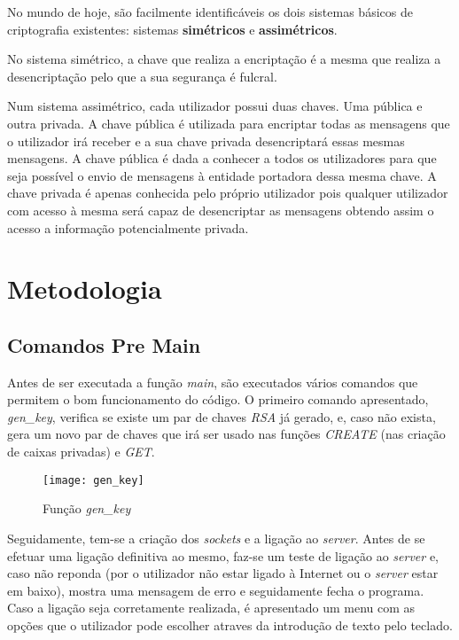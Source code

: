 \documentclass{report}
\begin{document}
No mundo de hoje, são facilmente identificáveis os dois sistemas básicos de criptografia existentes: sistemas \textbf{simétricos} e \textbf{assimétricos}.

No sistema simétrico, a chave que realiza a encriptação é a mesma que realiza a desencriptação pelo que a sua segurança é fulcral.

Num sistema assimétrico, cada utilizador possui duas chaves. Uma pública e outra privada.
A chave pública é utilizada para encriptar todas as mensagens que o utilizador irá receber e a sua chave privada desencriptará essas mesmas mensagens.
A chave pública é dada a conhecer a todos os utilizadores para que seja possível o envio de mensagens à entidade portadora dessa mesma chave.
A chave privada é apenas conhecida pelo próprio utilizador pois qualquer utilizador com acesso à mesma será capaz de desencriptar as mensagens obtendo assim o acesso a informação potencialmente privada.

\FloatBarrier
\chapter{Metodologia}
\label{chap.metodologia}
\section{Comandos Pre Main}

Antes de ser executada a função \textit{main}, são executados vários comandos que permitem o bom funcionamento do código.\br
O primeiro comando apresentado, \textit{gen\_key}, verifica se existe um par de chaves \textit{RSA} já gerado, e, caso não exista, gera um novo par de chaves que irá ser usado nas funções \textit{CREATE} (nas criação de caixas privadas) e \textit{GET}.


\begin{figure}[h]
\center
\texttt{[image: gen\_key]}
\caption{Função \textit{gen\_key}}
\label{fig:gen_key}
\end{figure}


Seguidamente, tem-se a criação dos \textit{sockets} e a ligação ao \textit{server}. Antes de se efetuar uma ligação definitiva ao mesmo, faz-se um teste de ligação ao \textit{server} e, caso não reponda (por o utilizador não estar ligado à Internet ou o \textit{server} estar em baixo), mostra uma mensagem de erro e seguidamente fecha o programa.\br
Caso a ligação seja corretamente realizada, é apresentado um menu com as opções que o utilizador pode escolher atraves da introdução de texto pelo teclado.
\end{document}
